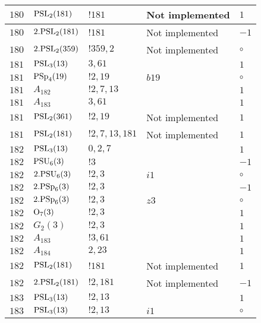\documentclass[a4paper, 11pt]{article}
\begin{document}
\begin{longtable}{lllll}
        $ 180 $ & $ {\rm PSL}_{2}(181) $ & $ !181 $ &  Not implemented & $ 1$ \\ \hline
        $ 180 $ & $ 2.{\rm PSL}_{2}(181) $ & $ !181 $ &  Not implemented & $ -1$ \\ \hline
        $ 180 $ & $ 2.{\rm PSL}_{2}(359) $ & $ !359, 2 $ &  Not implemented &  $\circ$ \\ \hline
        $ 181 $ & $ {\rm PSL}_{3}(13) $ & $ 3, 61 $ & $ ~ $ & $ 1$ \\ \hline
        $ 181 $ & $ {\rm PSp}_{4}(19) $ & $ ! 2,19 $ & $ b19 $ &  $\circ$ \\ \hline
        $ 181 $ & $ A_{182} $ & $ !2, 7, 13 $ & $ ~ $ & $ 1$ \\ \hline
        $ 181 $ & $ A_{183} $ & $ 3, 61 $ & $ ~ $ & $ 1$ \\ \hline
        $ 181 $ & $ {\rm PSL}_{2}(361) $ & $ !2, 19 $ &  Not implemented & $ 1$ \\ \hline
        $ 181 $ & $ {\rm PSL}_{2}(181) $ & $ !2, 7, 13, 181 $ &  Not implemented & $ 1$ \\ \hline
        $ 182 $ & $ {\rm PSL}_{3}(13) $ & $ 0,2,7 $ & $ ~ $ & $ 1$ \\ \hline
        $ 182 $ & $ {\rm PSU}_{6}(3) $ & $ ! 3 $ & $ ~ $ & $ -1$ \\ \hline
        $ 182 $ & $ 2.{\rm PSU}_{6}(3) $ & $ ! 2,3 $ & $ i1 $ &  $\circ$ \\ \hline
        $ 182 $ & $ 2.{\rm PSp}_{6}(3) $ & $ ! 2,3 $ & $ ~ $ & $ -1$ \\ \hline
        $ 182 $ & $ 2.{\rm PSp}_{6}(3) $ & $ ! 2,3 $ & $ z3 $ &  $\circ$ \\ \hline
        $ 182 $ & $ {\rm O}_{7}(3) $ & $ ! 2,3 $ & $ ~ $ & $ 1$ \\ \hline
        $ 182 $ & $ G_{2}(3) $ & $ ! 2,3 $ & $ ~ $ & $ 1$ \\ \hline
        $ 182 $ & $ A_{183} $ & $ !3, 61 $ & $ ~ $ & $ 1$ \\ \hline
        $ 182 $ & $ A_{184} $ & $ 2, 23 $ & $ ~ $ & $ 1$ \\ \hline
        $ 182 $ & $ {\rm PSL}_{2}(181) $ & $ !181 $ &  Not implemented & $ 1$ \\ \hline
        $ 182 $ & $ 2.{\rm PSL}_{2}(181) $ & $ !2, 181 $ &  Not implemented & $ -1$ \\ \hline
        $ 183 $ & $ {\rm PSL}_{3}(13) $ & $ ! 2,13 $ & $ ~ $ & $ 1$ \\ \hline
        $ 183 $ & $ {\rm PSL}_{3}(13) $ & $ ! 2,13 $ & $ i1 $ &  $\circ$ \\ \hline

\end{longtable}
\end{document}
